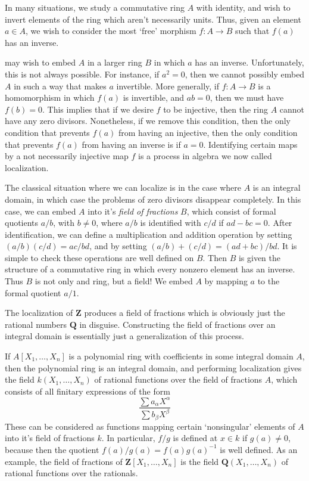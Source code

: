 In many situations, we study a commutative ring $A$ with identity, and wish to invert elements of the ring which aren't necessarily units. Thus, given an element $a \in A$, we wish to consider the most `free' morphism $f: A \to B$ such that $f(a)$ has an inverse.

may wish to embed $A$ in a larger ring $B$ in which $a$ has an inverse. Unfortunately, this is not always possible. For instance, if $a^2 = 0$, then we cannot possibly embed $A$ in such a way that makes $a$ invertible. More generally, if $f:A \to B$ is a homomorphism in which $f(a)$ is invertible, and $ab = 0$, then we must have $f(b) = 0$. This implies that if we desire $f$ to be injective, then the ring $A$ cannot have any zero divisors. Nonetheless, if we remove this condition, then the only condition that prevents $f(a)$ from having an injective, then the only condition that prevents $f(a)$ from having an inverse is if $a = 0$. Identifying certain maps by a not necessarily injective map $f$ is a process in algebra we now called localization.

The classical situation where we can localize is in the case where $A$ is an integral domain, in which case the problems of zero divisors disappear completely. In this case, we can embed $A$ into it's \emph{field of fractions} $B$, which consist of formal quotients $a/b$, with $b \neq 0$, where $a/b$ is identified with $c/d$ if $ad - bc = 0$. After identification, we can define a multiplication and addition operation by setting $(a/b)(c/d) = ac/bd$, and by setting $(a/b) + (c/d) = (ad + bc)/bd$. It is simple to check these operations are well defined on $B$. Then $B$ is given the structure of a commutative ring in which every nonzero element has an inverse. Thus $B$ is not only and ring, but a field! We embed $A$ by mapping $a$ to the formal quotient $a/1$.

\begin{example}
    The localization of $\mathbf{Z}$ produces a field of fractions which is obviously just the rational numbers $\mathbf{Q}$ in disguise. Constructing the field of fractions over an integral domain is essentially just a generalization of this process.
\end{example}

\begin{example}
    If $A[X_1, \dots, X_n]$ is a polynomial ring with coefficients in some integral domain $A$, then the polynomial ring is an integral domain, and performing localization gives the field $k(X_1, \dots, X_n)$ of rational functions over the field of fractions $A$, which consists of all finitary expressions of the form
    \[ \frac{\sum a_\alpha X^\alpha}{\sum b_\beta X^\beta} \]
    These can be considered as functions mapping certain `nonsingular' elements of $A$ into it's field of fractions $k$. In particular, $f/g$ is defined at $x \in k$ if $g(a) \neq 0$, because then the quotient $f(a)/g(a) = f(a) g(a)^{-1}$ is well defined. As an example, the field of fractions of $\mathbf{Z}[X_1, \dots, X_n]$ is the field $\mathbf{Q}(X_1, \dots, X_n)$ of rational functions over the rationals.
\end{example}

